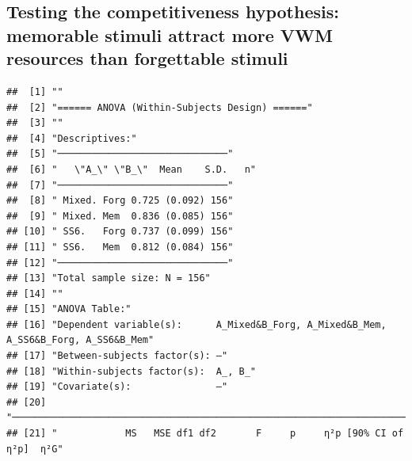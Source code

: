 \documentclass[
  man]{apa6}
\begin{document}
\hypertarget{testing-the-competitiveness-hypothesis-memorable-stimuli-attract-more-vwm-resources-than-forgettable-stimuli}{%
\subsection{Testing the competitiveness hypothesis: memorable stimuli attract more VWM resources than forgettable stimuli}\label{testing-the-competitiveness-hypothesis-memorable-stimuli-attract-more-vwm-resources-than-forgettable-stimuli}}

\begin{verbatim}
##  [1] ""                                                                                       
##  [2] "====== ANOVA (Within-Subjects Design) ======"                                           
##  [3] ""                                                                                       
##  [4] "Descriptives:"                                                                          
##  [5] "──────────────────────────────"                                                         
##  [6] "   \"A_\" \"B_\"  Mean    S.D.   n"                                                     
##  [7] "──────────────────────────────"                                                         
##  [8] " Mixed. Forg 0.725 (0.092) 156"                                                         
##  [9] " Mixed. Mem  0.836 (0.085) 156"                                                         
## [10] " SS6.   Forg 0.737 (0.099) 156"                                                         
## [11] " SS6.   Mem  0.812 (0.084) 156"                                                         
## [12] "──────────────────────────────"                                                         
## [13] "Total sample size: N = 156"                                                             
## [14] ""                                                                                       
## [15] "ANOVA Table:"                                                                           
## [16] "Dependent variable(s):      A_Mixed&B_Forg, A_Mixed&B_Mem, A_SS6&B_Forg, A_SS6&B_Mem"   
## [17] "Between-subjects factor(s): –"                                                          
## [18] "Within-subjects factor(s):  A_, B_"                                                     
## [19] "Covariate(s):               –"                                                          
## [20] "───────────────────────────────────────────────────────────────────────"                
## [21] "            MS   MSE df1 df2       F     p     η²p [90% CI of η²p]  η²G"                

\end{verbatim}
\end{document}

